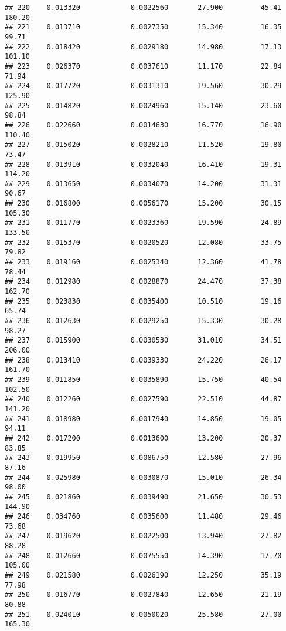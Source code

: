 \documentclass[
]{article}
\begin{document}
\begin{verbatim}
## 220    0.013320            0.0022560       27.900         45.41          180.20
## 221    0.013710            0.0027350       15.340         16.35           99.71
## 222    0.018420            0.0029180       14.980         17.13          101.10
## 223    0.026370            0.0037610       11.170         22.84           71.94
## 224    0.017720            0.0031310       19.560         30.29          125.90
## 225    0.014820            0.0024960       15.140         23.60           98.84
## 226    0.022660            0.0014630       16.770         16.90          110.40
## 227    0.015020            0.0028210       11.520         19.80           73.47
## 228    0.013910            0.0032040       16.410         19.31          114.20
## 229    0.013650            0.0034070       14.200         31.31           90.67
## 230    0.016800            0.0056170       15.200         30.15          105.30
## 231    0.011770            0.0023360       19.590         24.89          133.50
## 232    0.015370            0.0020520       12.080         33.75           79.82
## 233    0.019160            0.0025340       12.360         41.78           78.44
## 234    0.012980            0.0028870       24.470         37.38          162.70
## 235    0.023830            0.0035400       10.510         19.16           65.74
## 236    0.012630            0.0029250       15.330         30.28           98.27
## 237    0.015900            0.0030530       31.010         34.51          206.00
## 238    0.013410            0.0039330       24.220         26.17          161.70
## 239    0.011850            0.0035890       15.750         40.54          102.50
## 240    0.012260            0.0027590       22.510         44.87          141.20
## 241    0.018980            0.0017940       14.850         19.05           94.11
## 242    0.017200            0.0013600       13.200         20.37           83.85
## 243    0.019950            0.0086750       12.580         27.96           87.16
## 244    0.025980            0.0030870       15.010         26.34           98.00
## 245    0.021860            0.0039490       21.650         30.53          144.90
## 246    0.034760            0.0035600       11.480         29.46           73.68
## 247    0.019620            0.0022500       13.940         27.82           88.28
## 248    0.012660            0.0075550       14.390         17.70          105.00
## 249    0.021580            0.0026190       12.250         35.19           77.98
## 250    0.016770            0.0027840       12.650         21.19           80.88
## 251    0.024010            0.0050020       25.580         27.00          165.30

\end{verbatim}
\end{document}
